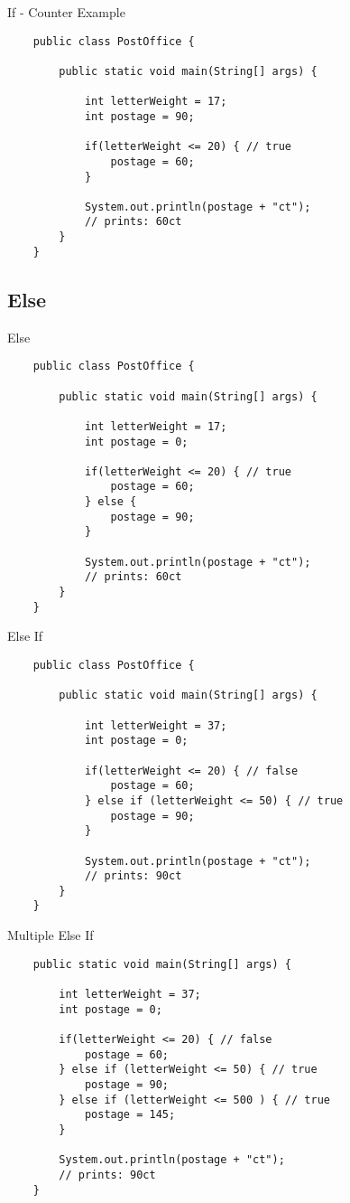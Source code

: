 \begin{frame}[fragile]{If - Counter Example}
	\begin{lstlisting}
	public class PostOffice {
	
	    public static void main(String[] args) {
	
	        int letterWeight = 17;
	        int postage = 90;
	    
	        if(letterWeight <= 20) { // true
	            postage = 60;
	        }
	        
	        System.out.println(postage + "ct");
	        // prints: 60ct
	    }
	}
	\end{lstlisting}
\end{frame}

\subsection{Else}
\begin{frame}[fragile]{Else}
	\begin{lstlisting}
	public class PostOffice {
	
	    public static void main(String[] args) {
	
	        int letterWeight = 17;
	        int postage = 0;
	    
	        if(letterWeight <= 20) { // true
	            postage = 60;
	        } else {
	            postage = 90;
	        }
	        
	        System.out.println(postage + "ct");
	        // prints: 60ct
	    }
	}
	\end{lstlisting}
\end{frame}

\begin{frame}[fragile]{Else If}
	\begin{lstlisting}
	public class PostOffice {
	
	    public static void main(String[] args) {
	
	        int letterWeight = 37;
	        int postage = 0;
	    
	        if(letterWeight <= 20) { // false
	            postage = 60;
	        } else if (letterWeight <= 50) { // true
	            postage = 90;
	        }
	        
	        System.out.println(postage + "ct");
	        // prints: 90ct
	    }
	}
	\end{lstlisting}
\end{frame}

\begin{frame}[fragile]{Multiple Else If}
	\begin{lstlisting}
	public static void main(String[] args) {
	
	    int letterWeight = 37;
	    int postage = 0;
	    
	    if(letterWeight <= 20) { // false
	        postage = 60;
	    } else if (letterWeight <= 50) { // true
	        postage = 90;
	    } else if (letterWeight <= 500 ) { // true
	        postage = 145;
	    }
	        
	    System.out.println(postage + "ct");
	    // prints: 90ct
	}
	\end{lstlisting}
\end{frame}

